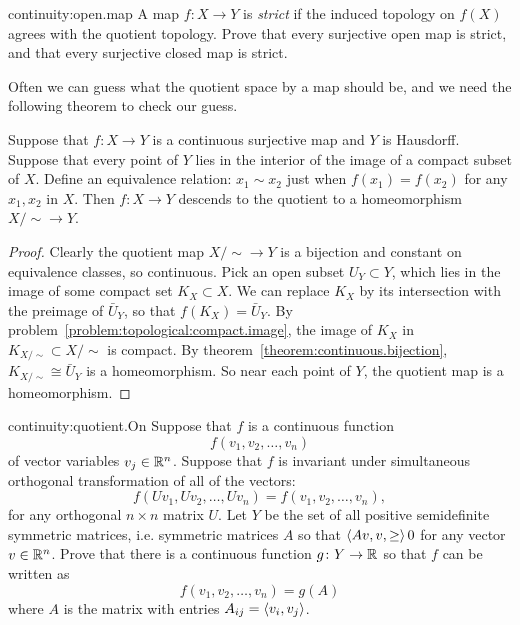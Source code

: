 \begin{problem}{continuity:open.map}
A map \(f\colon X \to Y\) is \emph{strict} if the induced topology on \(f(X)\) agrees with the quotient topology.
Prove that every surjective open map is strict, and that every surjective closed map is strict.
\end{problem}
Often we can guess what the quotient space by a map should be, and we need the following theorem to check our guess.
\begin{theorem}
Suppose that \(f \colon X \to Y\) is a continuous surjective map and \(Y\) is Hausdorff.
Suppose that every point of \(Y\) lies in the interior of the image of a compact subset of \(X\).
Define an equivalence relation: \(x_1 \sim x_2\) just when \(f(x_1)=f(x_2)\) for any \(x_1, x_2\) in \(X\).
Then \(f \colon X \to Y\) descends to the quotient to a homeomorphism \(X/{\sim} \to Y\).
\end{theorem}
\begin{proof}
Clearly the quotient map \(X/{\sim} \to Y\) is a bijection and constant on equivalence classes, so continuous.
Pick an open subset \(U_Y \subset Y\), which lies in the image of some compact set \(K_X \subset X\).
We can replace \(K_X\) by its intersection with the preimage of \(\bar{U}_Y\), so that \(f(K_X)=\bar{U}_Y\).
By problem~\vref{problem:topological:compact.image}, the image of \(K_X\) in \(K_{X/{\sim}} \subset X/{\sim}\) is compact.
By theorem~\vref{theorem:continuous.bijection}, \(K_{X/{\sim}} \cong \bar{U}_Y\) is a homeomorphism.
So near each point of \(Y\), the quotient map is a homeomorphism.
\end{proof}
\begin{problem*}{continuity:quotient.On}
Suppose that \(f\) is a continuous function
\[
f(v_1,v_2,\dots,v_n)
\]
of vector variables \(v_j\in\mathbb{R}^{n}\).
Suppose that \(f\) is invariant under simultaneous orthogonal transformation of all of the vectors:
\[
f(Uv_1,Uv_2,\dots,Uv_n)=f(v_1,v_2,\dots,v_n),
\]
for any orthogonal \(n\times n\) matrix \(U\).
Let \(Y\) be the set of all positive semidefinite symmetric matrices, i.e. symmetric matrices \(A\) so that \(\left<Av,v,\ge\right> 0\) for any vector \(v\in\mathbb{R}^{n}\).
Prove that there is a continuous function \(g\colon Y \to\mathbb{R}^{}\) so that \(f\) can be written as 
\[
f(v_1,v_2,\dots,v_n)=g(A)
\]
where \(A\) is the matrix with entries \(A_{ij}=\left<v_i,v_j\right>\).
\end{problem*}
